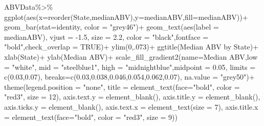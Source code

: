 \documentclass[
]{article}
\newenvironment{Shaded}{\begin{snugshade}}{\end{snugshade}}
\newcommand{\AttributeTok}[1]{\textcolor[rgb]{0.77,0.63,0.00}{#1}}
\newcommand{\ConstantTok}[1]{\textcolor[rgb]{0.00,0.00,0.00}{#1}}
\newcommand{\DecValTok}[1]{\textcolor[rgb]{0.00,0.00,0.81}{#1}}
\newcommand{\FloatTok}[1]{\textcolor[rgb]{0.00,0.00,0.81}{#1}}
\newcommand{\FunctionTok}[1]{\textcolor[rgb]{0.00,0.00,0.00}{#1}}
\newcommand{\NormalTok}[1]{#1}
\newcommand{\SpecialCharTok}[1]{\textcolor[rgb]{0.00,0.00,0.00}{#1}}
\newcommand{\StringTok}[1]{\textcolor[rgb]{0.31,0.60,0.02}{#1}}
\begin{document}
\begin{Shaded}
\begin{Highlighting}[]
\NormalTok{ABVData}\SpecialCharTok{\%\textgreater{}\%}
  \FunctionTok{ggplot}\NormalTok{(}\FunctionTok{aes}\NormalTok{(}\AttributeTok{x=}\FunctionTok{reorder}\NormalTok{(State,medianABV),}\AttributeTok{y=}\NormalTok{medianABV,}\AttributeTok{fill=}\NormalTok{medianABV))}\SpecialCharTok{+}
  \FunctionTok{geom\_bar}\NormalTok{(}\AttributeTok{stat=}\StringTok{\textquotesingle{}identity\textquotesingle{}}\NormalTok{, }\AttributeTok{color =} \StringTok{"grey46"}\NormalTok{)}\SpecialCharTok{+}
  \FunctionTok{geom\_text}\NormalTok{(}\FunctionTok{aes}\NormalTok{(}\AttributeTok{label  =}\NormalTok{ medianABV), }\AttributeTok{vjust =} \SpecialCharTok{{-}}\FloatTok{1.5}\NormalTok{, }\AttributeTok{size =} \FloatTok{2.2}\NormalTok{, }\AttributeTok{color =} \StringTok{"black"}\NormalTok{,}\AttributeTok{fontface =}  \StringTok{"bold"}\NormalTok{,}\AttributeTok{check\_overlap =} \ConstantTok{TRUE}\NormalTok{)}\SpecialCharTok{+}
  \FunctionTok{ylim}\NormalTok{(}\DecValTok{0}\NormalTok{,.}\DecValTok{073}\NormalTok{)}\SpecialCharTok{+}
  \FunctionTok{ggtitle}\NormalTok{(}\StringTok{\textquotesingle{}Median ABV by State\textquotesingle{}}\NormalTok{)}\SpecialCharTok{+}
  \FunctionTok{xlab}\NormalTok{(}\StringTok{\textquotesingle{}State\textquotesingle{}}\NormalTok{)}\SpecialCharTok{+}
  \FunctionTok{ylab}\NormalTok{(}\StringTok{\textquotesingle{}Median ABV\textquotesingle{}}\NormalTok{)}\SpecialCharTok{+}
  \FunctionTok{scale\_fill\_gradient2}\NormalTok{(}\AttributeTok{name=}\StringTok{\textquotesingle{}Median ABV\textquotesingle{}}\NormalTok{,}\AttributeTok{low =} \StringTok{"white"}\NormalTok{, }\AttributeTok{mid =} \StringTok{"steelblue1"}\NormalTok{, }\AttributeTok{high =} \StringTok{"midnightblue"}\NormalTok{,}\AttributeTok{midpoint =} \FloatTok{0.05}\NormalTok{, }\AttributeTok{limits =} \FunctionTok{c}\NormalTok{(}\FloatTok{0.03}\NormalTok{,}\FloatTok{0.07}\NormalTok{), }
                       \AttributeTok{breaks=}\FunctionTok{c}\NormalTok{(}\FloatTok{0.03}\NormalTok{,}\FloatTok{0.038}\NormalTok{,}\FloatTok{0.046}\NormalTok{,}\FloatTok{0.054}\NormalTok{,}\FloatTok{0.062}\NormalTok{,}\FloatTok{0.07}\NormalTok{), }\AttributeTok{na.value =} \StringTok{"grey50"}\NormalTok{)}\SpecialCharTok{+}
  \FunctionTok{theme}\NormalTok{(}\AttributeTok{legend.position =} \StringTok{"none"}\NormalTok{,}
        \AttributeTok{title =} \FunctionTok{element\_text}\NormalTok{(}\AttributeTok{face=}\StringTok{"bold"}\NormalTok{, }\AttributeTok{color =} \StringTok{"red3"}\NormalTok{, }\AttributeTok{size =} \DecValTok{12}\NormalTok{),}
        \AttributeTok{axis.text.y =} \FunctionTok{element\_blank}\NormalTok{(),}
        \AttributeTok{axis.title.y =} \FunctionTok{element\_blank}\NormalTok{(),}
        \AttributeTok{axis.ticks.y =} \FunctionTok{element\_blank}\NormalTok{(),}
        \AttributeTok{axis.text.x =} \FunctionTok{element\_text}\NormalTok{(}\AttributeTok{size =} \DecValTok{7}\NormalTok{),}
        \AttributeTok{axis.title.x =} \FunctionTok{element\_text}\NormalTok{(}\AttributeTok{face=}\StringTok{"bold"}\NormalTok{, }\AttributeTok{color =} \StringTok{"red3"}\NormalTok{, }\AttributeTok{size =} \DecValTok{9}\NormalTok{))}
\end{Highlighting}
\end{Shaded}
\end{document}
